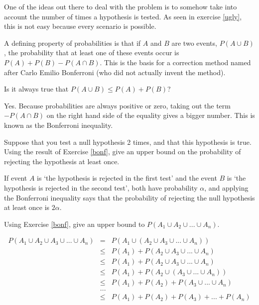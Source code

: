 \documentclass[a4paper]{article}
\theoremstyle{definition}
\begin{document}
One of the ideas out there to deal with the problem is to somehow
take into account the number of times a hypothesis is tested.
As seen in exercise \ref{ugly}, this is not easy because every
scenario is possible.

A defining property of probabilities is that if $A$ and $B$ are
two events, $P(A \cup B)$, the probability that at least one
of these events occur is $P(A) + P(B) - P(A \cap B)$. This is
the basis for a correction method named after Carlo Emilio Bonferroni
(who did not actually invent the method).

\begin{Exercise}
\label{bonf}
Is it always true that $P(A \cup B) \leq P(A) + P(B)$?
\end{Exercise}
\begin{Answer}
Yes. Because probabilities are always positive or zero, taking out
the term $-P(A \cap B)$ on the right hand side of the equality gives
a bigger number. This is known as the Bonferroni inequality.
\end{Answer}

\begin{Exercise}
Suppose that you test a null hypothesis 2 times, and that this
hypothesis is true. Using the result of Exercise \ref{bonf}, give an
upper bound on the probability of rejecting the hypothesis at least
once.
\end{Exercise}
\begin{Answer}
If event $A$ is `the hypothesis is rejected in the first test' and
the event $B$ is `the hypothesis is rejected in the second test',
both have probability $\alpha$, and applying the Bonferroni inequality
says that the probability of rejecting the null hypothesis at least
once is $2 \alpha$.
\end{Answer}

\begin{Exercise}
Using Exercise \ref{bonf}, give an upper bound to
$P(A_1 \cup A_2 \cup ... \cup A_n)$.
\end{Exercise}
\begin{Answer}
\begin{eqnarray*}
  P(A_1 \cup A_2 \cup A_3 \cup ... \cup A_n)
    &=& P(A_1 \cup (A_2 \cup A_3 \cup ... \cup A_n)) \\
    &\leq& P(A_1) + P(A_2 \cup A_3 \cup ... \cup A_n) \\
    &\leq& P(A_1) + P(A_2 \cup A_3 \cup ... \cup A_n) \\
    &\leq& P(A_1) + P(A_2 \cup (A_3 \cup ... \cup A_n)) \\
    &\leq& P(A_1) + P(A_2) + P(A_3 \cup ... \cup A_n) \\
    &...& \\
    &\leq& P(A_1) + P(A_2) + P(A_3) + ... + P(A_n)
  \end{eqnarray*}
\end{Answer}
\end{document}
